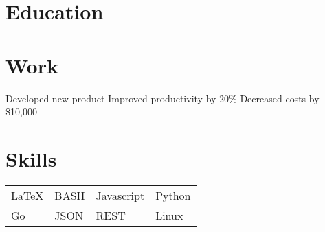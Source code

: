 \documentclass{my_cv}
\begin{document}
\section{Education}
\section{Work}
\workitems
{Developed new product}
{Improved productivity by 20\%}
{Decreased costs by \$10,000}

\section{Skills}
\begin{tabular}{l l l l}
\LaTeX{} & BASH & Javascript & Python  \\
    Go & JSON & REST & Linux
\end{tabular}
\end{document}
